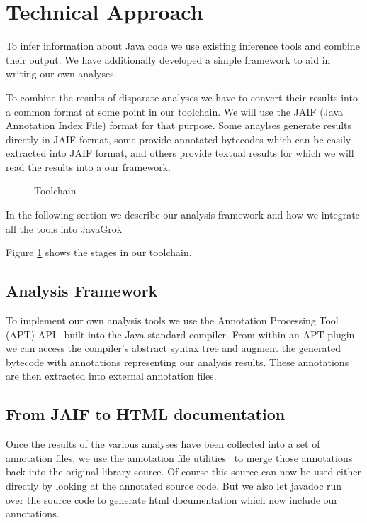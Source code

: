 \section{Technical Approach}
To infer information about Java code we use existing inference tools and
combine their output. We have additionally developed a simple framework to aid
in writing our own analyses.

To combine the results of disparate analyses we have to convert their results
into a common format at some point in our toolchain.  We will use the JAIF
(Java Annotation Index File) format for that purpose.  Some anaylses generate
results directly in JAIF format, some provide annotated bytecodes which can be
easily extracted into JAIF format, and others provide textual results for which
we will read the results into a our framework.

\begin{figure}
\centering
{}
\caption{Toolchain}
\label{fig:toolchain}
\end{figure}

In the following section we describe our analysis framework and how we
integrate all the tools into JavaGrok

Figure \ref{fig:toolchain} shows the stages in our toolchain.

\subsection{Analysis Framework}
\label{ss:analysisFramework}

To implement our own analysis tools we use the Annotation Processing Tool (APT)
API~\cite{apt} built into the Java standard compiler.  From within an APT plugin
we can access the compiler's abstract syntax tree and augment the generated
bytecode with annotations representing our analysis results. These annotations
are then extracted into external annotation files.

\subsection{From JAIF to HTML documentation}
\label{sec:jaif2html}

Once the results of the various analyses have been collected into a set of
annotation files, we use the annotation file utilities~\cite{AFU} to merge
those annotations back into the original library source. Of course this source
can now be used either directly by looking at the annotated source code. But
we also let javadoc run over the source code to generate html documentation
which now include our annotations.
